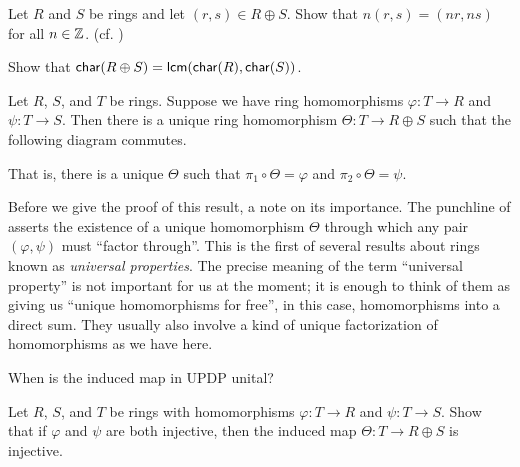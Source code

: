 \begin{exercise}
Let \(R\) and \(S\) be rings and let \((r,s) \in R \oplus S\). Show that \(n(r,s) = (nr, ns)\) for all \(n \in \mathbb{Z}\). (cf. )
\end{exercise}

\begin{exercise}
Show that \(\mathsf{char}(R \oplus S) = \mathsf{lcm}(\mathsf{char}(R), \mathsf{char}(S))\).
\end{exercise}

\begin{exercise} \label{exerc:up-direct-sum} 
Let \(R\), \(S\), and \(T\) be rings. Suppose we have ring homomorphisms \(\varphi : T \rightarrow R\) and \(\psi : T \rightarrow S\). Then there is a unique ring homomorphism \(\Theta : T \rightarrow R \oplus S\) such that the following diagram commutes.
\begin{center}
\end{center}
That is, there is a unique \(\Theta\) such that \(\pi_1 \circ \Theta = \varphi\) and \(\pi_2 \circ \Theta = \psi\).
\end{exercise}

Before we give the proof of this result, a note on its importance. The punchline of  asserts the existence of a unique homomorphism \(\Theta\) through which any pair \((\varphi, \psi)\) must ``factor through''. This is the first of several results about rings known as \emph{universal properties}. The precise meaning of the term ``universal property'' is not important for us at the moment; it is enough to think of them as giving us ``unique homomorphisms for free'', in this case, homomorphisms into a direct sum. They usually also involve a kind of unique factorization of homomorphisms as we have here.

\begin{exercise}
When is the induced map in UPDP unital?
\end{exercise}

\begin{exercise}
Let \(R\), \(S\), and \(T\) be rings with homomorphisms \(\varphi : T \rightarrow R\) and \(\psi : T \rightarrow S\). Show that if \(\varphi\) and \(\psi\) are both injective, then the induced map \(\Theta : T \rightarrow R \oplus S\) is injective.
\end{exercise}

